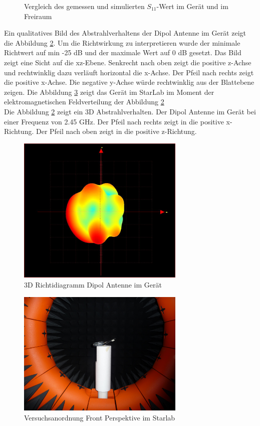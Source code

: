 \begin{figure}[!ht]
	\centering
	\begingroup
	
	\endgroup
	\caption{Vergleich des gemessen und simulierten $S_{11}$-Wert im Ger\"at und im Freiraum}	\label{S11_Messung_Simulation_Dipolantenn_Freiraum}
\end{figure}
\newpage
Ein qualitatives Bild des Abstrahlverhaltens der Dipol Antenne im Gerät zeigt die Abbildung \ref{fig:3D Richtdiagramm}. Um die Richtwirkung zu interpretieren wurde der minimale Richtwert auf min -25 dB und der maximale Wert auf 0 dB gesetzt. Das Bild zeigt eine Sicht auf die xz-Ebene. Senkrecht nach oben zeigt die positive z-Achse und rechtwinklig dazu verläuft horizontal die x-Achse. Der Pfeil nach rechts zeigt die positive x-Achse. Die negative y-Achse würde rechtwinklig aus der Blattebene zeigen. Die Abbildung \ref{fig:FrontStarLab} zeigt das Gerät im StarLab im Moment der elektromagnetischen Feldverteilung der Abbildung \ref{fig:3D Richtdiagramm}\\
\newpage
Die Abbildung \ref{fig:3D Richtdiagramm} zeigt ein 3D Abstrahlverhalten. Der Dipol Antenne im Gerät bei einer Frequenz von 2.45 GHz. Der Pfeil nach rechts zeigt in die positive x-Richtung. Der Pfeil nach oben zeigt in die positive z-Richtung.
\begin{figure}[!h]
	\centering
	\includegraphics[width=8cm]{content/bilder/Implementierung/min25_0_x_yhinten_zoben.JPG}%
	\caption{3D Richtidiagramm Dipol Antenne im Gerät}
	\label{fig:3D Richtdiagramm}
\end{figure}
\begin{figure}[!h]
	\centering
	\includegraphics[width=8cm]{content/bilder/Implementierung/Front.JPG}%
	\caption{Versuchsanordnung Front Perspektive im Starlab}
	\label{fig:FrontStarLab}
\end{figure}
